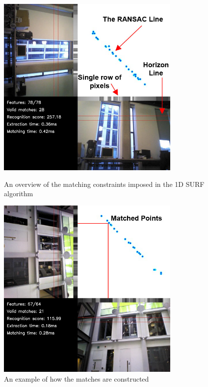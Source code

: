 \begin{figure}[ht!]
\begin{minipage}[b]{0.5\linewidth}
  \centering
    \includegraphics[width=0.8\textwidth]{../Drawings/constraints/matchingLabelled.jpg}
    \caption{An overview of the matching constraints imposed in the 1D SURF algorithm} 
    \label{fig:ransacOverview}
\end{minipage}
\begin{minipage}[b]{0.5\linewidth}
  \centering
    \includegraphics[width=0.8\textwidth]{../Drawings/constraints/matchedPoints.jpg}
    \caption{An example of how the matches are constructed} 
    \label{fig:ransacExample}
\end{minipage}
\end{figure}